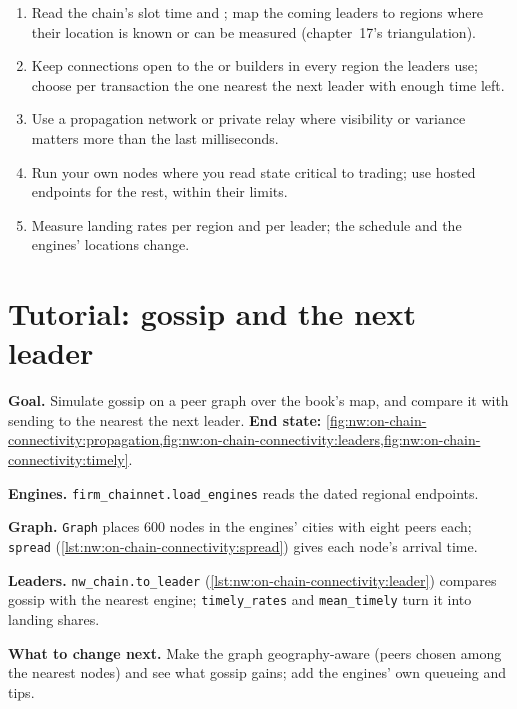 \begin{method}\label{met:nw:on-chain-connectivity:send}
\begin{enumerate}
\item Read the chain's slot time and ; map the coming leaders to regions where their location is known or can be measured
  (chapter~17's triangulation).
\item Keep connections open to the  or builders in every region the leaders use; choose per transaction the one nearest the next
  leader with enough time left.
\item Use a propagation network or private relay where visibility or variance matters more than the last milliseconds.
\item Run your own nodes where you read state critical to trading; use hosted endpoints for the rest, within their limits.
\item Measure landing rates per region and per leader; the schedule and the engines' locations change.
\end{enumerate}
\end{method}

\section{Tutorial: gossip and the next leader}\label{tut:nw:on-chain-connectivity:tut}

\begin{tutorial}
\textbf{Goal.} Simulate gossip on a peer graph over the book's map, and compare it with sending to the  nearest the next leader.
\textbf{End state:} \cref{fig:nw:on-chain-connectivity:propagation,fig:nw:on-chain-connectivity:leaders,fig:nw:on-chain-connectivity:timely}.
\begin{tutsteps}
\item \textbf{Engines.} \texttt{firm\_chainnet.load\_engines} reads the dated regional endpoints.
\item \textbf{Graph.} \texttt{Graph} places 600 nodes in the engines' cities with eight peers each; \texttt{spread} (\cref{lst:nw:on-chain-connectivity:spread})
  gives each node's arrival time.
\item \textbf{Leaders.} \texttt{nw\_chain.to\_leader} (\cref{lst:nw:on-chain-connectivity:leader}) compares gossip with the nearest engine;
  \texttt{timely\_rates} and \texttt{mean\_timely} turn it into landing shares.
\end{tutsteps}
\textbf{What to change next.} Make the graph geography-aware (peers chosen among the nearest nodes) and see what gossip gains; add the engines'
own queueing and tips.
\end{tutorial}

